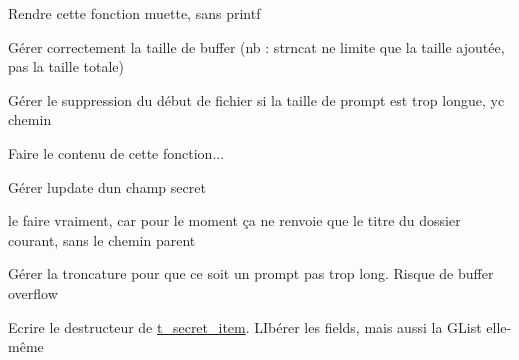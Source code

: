 
\begin{DoxyRefList}
\item[\label{todo__todo000008}%
\Hypertarget{todo__todo000008}%
Member \hyperlink{classt__database_a827029592098239b9d39cb907fb7b305}{t\+\_\+database\+:\+:find\+\_\+chunk\+\_\+holder} (char $\ast$nickname, char $\ast$password, int $\ast$file\+\_\+index, unsigned char $\ast$pkey)]Rendre cette fonction muette, sans printf  
\item[\label{todo__todo000007}%
\Hypertarget{todo__todo000007}%
Member \hyperlink{classt__database_ad8a52cfc74f60fa35aa81078388e3d4f}{t\+\_\+database\+:\+:prompt} ()]Gérer correctement la taille de buffer (nb \+: strncat ne limite que la taille ajoutée, pas la taille totale) 

Gérer le suppression du début de fichier si la taille de prompt est trop longue, yc chemin  
\item[\label{todo__todo000009}%
\Hypertarget{todo__todo000009}%
Member \hyperlink{classt__holder_a0c5f8f994532f9bdf72f870d9c66e2b1}{t\+\_\+holder\+:\+:test\+\_\+password} (char $\ast$mdp)]Faire le contenu de cette fonction...  
\item[\label{todo__todo000010}%
\Hypertarget{todo__todo000010}%
Member \hyperlink{classt__secret__field_ae5d2d9cd45e310e33ccf9d3cc8da8bb1}{t\+\_\+secret\+\_\+field\+:\+:update} (char $\ast$value\+\_\+)]Gérer l\textquotesingle{}update d\textquotesingle{}un champ secret  
\item[\label{todo__todo000012}%
\Hypertarget{todo__todo000012}%
Member \hyperlink{classt__secret__folder_a6e853312c39540414f50ba796f9961da}{t\+\_\+secret\+\_\+folder\+:\+:get\+\_\+title\+\_\+path} ()]le faire vraiment, car pour le moment ça ne renvoie que le titre du dossier courant, sans le chemin parent  
\item[\label{todo__todo000013}%
\Hypertarget{todo__todo000013}%
Member \hyperlink{classt__secret__folder_a8bc7cf9c9c5abc10bded9c3d4c54da26}{t\+\_\+secret\+\_\+folder\+:\+:prompt} ()]Gérer la troncature pour que ce soit un prompt pas trop long. Risque de buffer overflow  
\item[\label{todo__todo000011}%
\Hypertarget{todo__todo000011}%
Member \hyperlink{classt__secret__item_a69e1fb6f4157b29853aea12ea289a435}{t\+\_\+secret\+\_\+item\+:\+:$\sim$t\+\_\+secret\+\_\+item} ()]Ecrire le destructeur de \hyperlink{classt__secret__item}{t\+\_\+secret\+\_\+item}. L\+Ibérer les fields, mais aussi la G\+List elle-\/même 
\end{DoxyRefList}